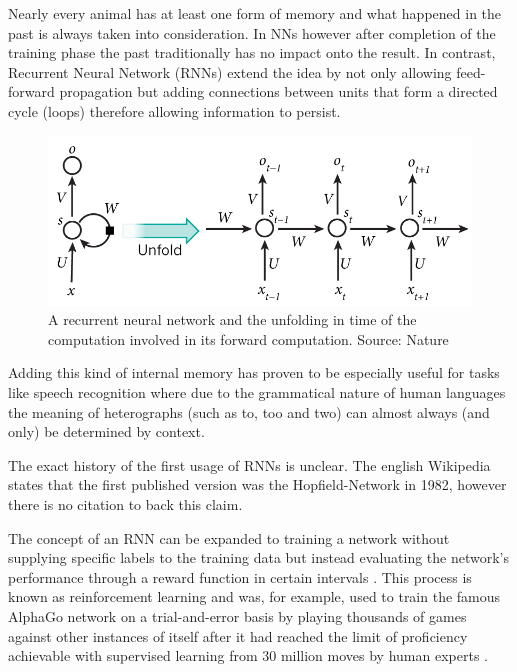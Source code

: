 


Nearly every animal has at least one form of memory and what happened in the past is always taken into consideration. In NNs however after completion of the training phase the past traditionally has no impact onto the result. 
In contrast, Recurrent Neural Network (RNNs) extend the idea by not only allowing feed-forward propagation but adding connections between units that form a directed cycle (loops) therefore allowing information to persist. 

\begin{figure}[h]
    \centering
	\includegraphics[width=.8\textwidth]{./images/illustrations/rnn}
    \caption{A recurrent neural network and the unfolding in time of the computation involved in its forward computation. Source: Nature}
    \label{fig:rnn}
\end{figure}


Adding this kind of internal memory has proven to be especially useful for tasks like speech recognition \cite{sak2014long} where due to the grammatical nature of human languages the meaning of heterographs (such as to, too and two) can almost always (and only) be determined by context.

The exact history of the first usage of RNNs is unclear. The english Wikipedia states that the first published version was the Hopfield-Network in 1982, however there is no citation to back this claim.

The concept of an RNN can be expanded to training a network without supplying specific labels to the training data but instead evaluating the network's performance through a reward function in certain intervals \cite{sutton1998reinforcement}. This process is known as reinforcement learning and was, for example, used to train the famous AlphaGo network on a trial-and-error basis by playing thousands of games against other instances of itself after it had reached the limit of proficiency achievable with supervised learning from 30 million moves by human experts \cite{alphaGo}.

